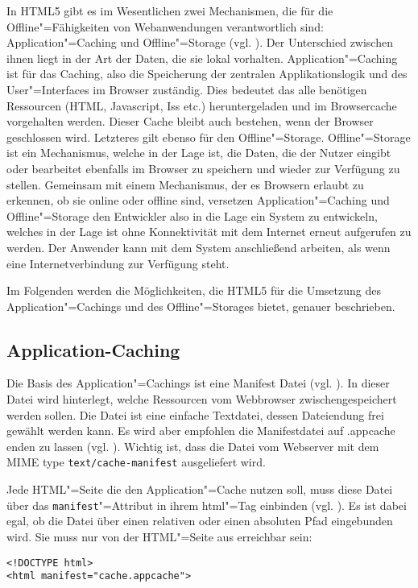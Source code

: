 In \ac{HTML}5 gibt es im Wesentlichen zwei Mechanismen, die für die Offline"=Fähigkeiten von Webanwendungen verantwortlich sind: Application"=Caching und Offline"=Storage (vgl. \cite{Mahemoff22010}). Der Unterschied zwischen ihnen liegt in der Art der Daten, die sie lokal vorhalten. Application"=Caching ist für das Caching, also die Speicherung der zentralen Applikationslogik und des User"=Interfaces im Browser zuständig. Dies bedeutet das alle benötigen Ressourcen (\ac{HTML}, Javascript, Iss etc.) heruntergeladen und im Browsercache vorgehalten werden. Dieser Cache bleibt auch bestehen, wenn der Browser geschlossen wird. Letzteres gilt ebenso für den Offline"=Storage. Offline"=Storage ist ein Mechanismus, welche in der Lage ist, die Daten, die der Nutzer eingibt oder bearbeitet ebenfalls im Browser zu speichern und wieder zur Verfügung zu stellen. Gemeinsam mit einem Mechanismus, der es Browsern erlaubt zu erkennen, ob sie online oder offline sind, versetzen Application"=Caching und Offline"=Storage den Entwickler also in die Lage ein System zu entwickeln, welches in der Lage ist ohne Konnektivität mit dem Internet erneut aufgerufen zu werden. Der Anwender kann mit dem System anschließend arbeiten, als wenn eine Internetverbindung zur Verfügung steht.

Im Folgenden werden die Möglichkeiten, die \ac{HTML}5 für die Umsetzung des Application"=Cachings und des Offline"=Storages bietet, genauer beschrieben.

\subsection{Application-Caching}\label{section:appcache}
Die Basis des Application"=Cachings ist eine Manifest Datei (vgl. \cite{Bidelman2010}). In dieser Datei wird hinterlegt, welche Ressourcen vom Webbrowser zwischengespeichert werden sollen. Die Datei ist eine einfache Textdatei, dessen Dateiendung frei gewählt werden kann. Es wird aber empfohlen die Manifestdatei auf .appcache enden zu lassen (vgl. \cite{W3C2012}). Wichtig ist, dass die Datei vom Webserver mit dem MIME type \texttt{text/cache-manifest} ausgeliefert wird.

Jede \ac{HTML}"=Seite die den Application"=Cache nutzen soll, muss diese Datei über das \texttt{ma\allowbreak ni\allowbreak fest}"=Attribut in ihrem html"=Tag einbinden (vgl. \cite{html5upandrunning}). Es ist dabei egal, ob die Datei über einen relativen oder einen absoluten Pfad eingebunden wird. Sie muss nur von der \ac{HTML}"=Seite aus erreichbar sein:
\begin{lstlisting}
<!DOCTYPE html>
<html manifest="cache.appcache">
\end{lstlisting}

